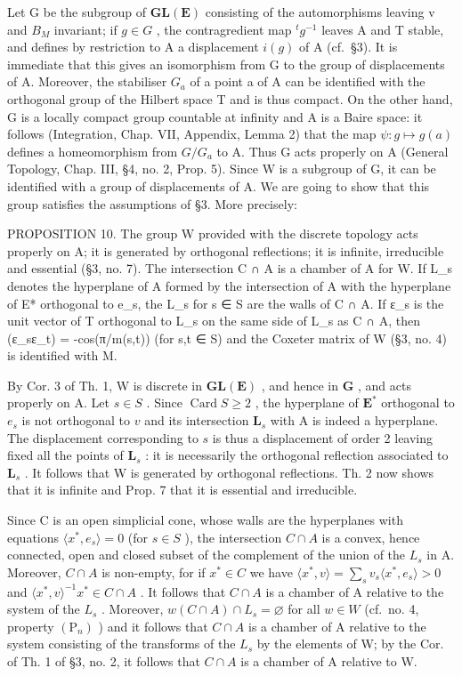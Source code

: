 Let G be the subgroup of \(\mathbf{GL}(\mathbf{E})\) consisting of the automorphisms leaving v and \(B_{M}\) invariant; if \(g \in G\) , the contragredient map \({}^{t}g^{-1}\) leaves A and T stable, and defines by restriction to A a displacement \(i(g)\) of A (cf.~§3). It is immediate that this gives an isomorphism from G to the group of displacements of A. Moreover, the stabiliser \(G_{a}\) of a point a of A can be identified with the orthogonal group of the Hilbert space T and is thus compact. On the other hand, G is a locally compact group countable at infinity and A is a Baire space: it follows (Integration, Chap. VII, Appendix, Lemma 2) that the map \(\psi : g \mapsto g(a)\) defines a homeomorphism from \(G/G_a\) to A. Thus G acts properly on A (General Topology, Chap. III, §4, no. 2, Prop. 5). Since W is a subgroup of G, it can be identified with a group of displacements of A. We are going to show that this group satisfies the assumptions of §3. More precisely:

PROPOSITION 10. The group W provided with the discrete topology acts properly on A; it is generated by orthogonal reflections; it is infinite, irreducible and essential (§3, no. 7). The intersection C ∩ A is a chamber of A for W. If L\_s denotes the hyperplane of A formed by the intersection of A with the hyperplane of E* orthogonal to e\_s, the L\_s for s ∈ S are the walls of C ∩ A. If ε\_s is the unit vector of T orthogonal to L\_s on the same side of L\_s as C ∩ A, then (ε\_s\textbar ε\_t) = -cos(π/m(s,t)) (for s,t ∈ S) and the Coxeter matrix of W (§3, no. 4) is identified with M.

By Cor. 3 of Th. 1, W is discrete in \(\mathbf{GL}(\mathbf{E})\) , and hence in \(\mathbf{G}\) , and acts properly on A. Let \(s \in S\) . Since \(\operatorname{Card} S \geqslant 2\) , the hyperplane of \(\mathbf{E}^*\) orthogonal to \(e_s\) is not orthogonal to \(v\) and its intersection \(\mathbf{L}_s\) with A is indeed a hyperplane. The displacement corresponding to \(s\) is thus a displacement of order 2 leaving fixed all the points of \(\mathbf{L}_s\) : it is necessarily the orthogonal reflection associated to \(\mathbf{L}_s\) . It follows that W is generated by orthogonal reflections. Th. 2 now shows that it is infinite and Prop. 7 that it is essential and irreducible.

Since C is an open simplicial cone, whose walls are the hyperplanes with equations \(\langle x^{*}, e_{s} \rangle = 0\) (for \(s \in S\) ), the intersection \(C \cap A\) is a convex, hence connected, open and closed subset of the complement of the union of the \(L_{s}\) in A. Moreover, \(C \cap A\) is non-empty, for if \(x^{*} \in C\) we have \(\langle x^{*}, v \rangle = \sum_{s} v_{s} \langle x^{*}, e_{s} \rangle > 0\) and \(\langle x^{*}, v \rangle^{-1} x^{*} \in C \cap A\) . It follows that \(C \cap A\) is a chamber of A relative to the system of the \(L_{s}\) . Moreover, \(w(C \cap A) \cap L_{s} = \varnothing\) for all \(w \in W\) (cf.~no. 4, property \((\mathrm{P}_{n})\) ) and it follows that \(C \cap A\) is a chamber of A relative to the system consisting of the transforms of the \(L_{s}\) by the elements of W; by the Cor. of Th. 1 of §3, no. 2, it follows that \(C \cap A\) is a chamber of A relative to W.

